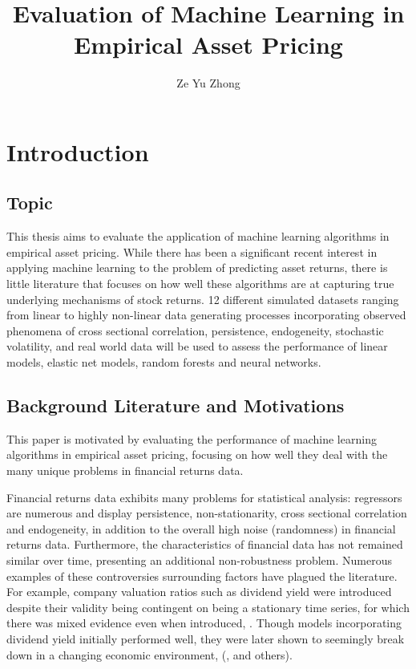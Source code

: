 \documentclass[a4paper]{article}
\title{Evaluation of Machine Learning in Empirical Asset Pricing}
\author{Ze Yu Zhong}
\begin{document}
	
	\maketitle
	
	
	
	\section{Introduction}
	
	\subsection{Topic}
	
	This thesis aims to evaluate the application of machine learning algorithms in empirical asset pricing. While there has been a significant recent interest in applying machine learning to the problem of predicting asset returns, there is little literature that focuses on how well these algorithms are at capturing true underlying mechanisms of stock returns. 12 different simulated datasets ranging from linear to highly non-linear data generating processes incorporating observed phenomena of cross sectional correlation, persistence, endogeneity, stochastic volatility, and real world data will be used to assess the performance of linear models, elastic net models, random forests and neural networks.
	
	\subsection{Background Literature and Motivations}
	
	This paper is motivated by evaluating the performance of machine learning algorithms in empirical asset pricing, focusing on how well they deal with the many unique problems in financial returns data.
	
	Financial returns data exhibits many problems for statistical analysis: regressors are numerous and display persistence, non-stationarity, cross sectional correlation and endogeneity, in addition to the overall high noise (randomness) in financial returns data. Furthermore, the characteristics of financial data has not remained similar over time, presenting an additional non-robustness problem. Numerous examples of these  controversies surrounding factors have plagued the literature. For example, company valuation ratios such as dividend yield were introduced despite their validity being contingent on being a stationary time series, for which there was mixed evidence even when introduced, \citep{vuolteenaho_understanding_1999}. Though models incorporating dividend yield initially performed well, they were later shown to seemingly break down in a changing economic environment, (\cite{lettau_consumption_2001}, \cite{schwert_anomalies_2003} and others).
	
\end{document}
